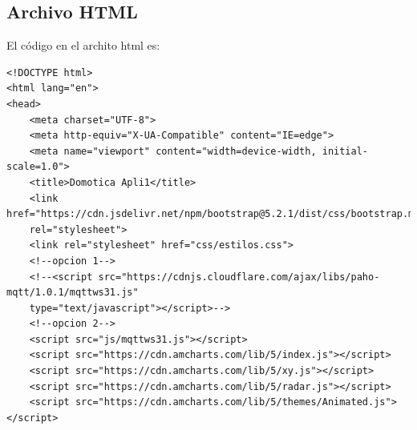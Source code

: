 \documentclass[oneside]{article}
\begin{document}
\subsection*{Archivo HTML}
El código en el archito html es:
\begin{lstlisting}
<!DOCTYPE html>
<html lang="en">
<head>
    <meta charset="UTF-8">
    <meta http-equiv="X-UA-Compatible" content="IE=edge">
    <meta name="viewport" content="width=device-width, initial-scale=1.0">
    <title>Domotica Apli1</title>
    <link href="https://cdn.jsdelivr.net/npm/bootstrap@5.2.1/dist/css/bootstrap.min.css"
    rel="stylesheet">
    <link rel="stylesheet" href="css/estilos.css">
    <!--opcion 1-->
    <!--<script src="https://cdnjs.cloudflare.com/ajax/libs/paho-mqtt/1.0.1/mqttws31.js"
    type="text/javascript"></script>-->
    <!--opcion 2-->
    <script src="js/mqttws31.js"></script>
    <script src="https://cdn.amcharts.com/lib/5/index.js"></script>
    <script src="https://cdn.amcharts.com/lib/5/xy.js"></script>
    <script src="https://cdn.amcharts.com/lib/5/radar.js"></script>
    <script src="https://cdn.amcharts.com/lib/5/themes/Animated.js"></script>


\end{lstlisting}
\end{document}
